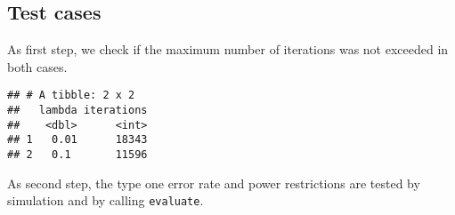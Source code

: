 \documentclass[
]{book}
\newenvironment{Shaded}{\begin{snugshade}}{\end{snugshade}}
\newcommand{\DataTypeTok}[1]{\textcolor[rgb]{0.13,0.29,0.53}{#1}}
\newcommand{\KeywordTok}[1]{\textcolor[rgb]{0.13,0.29,0.53}{\textbf{#1}}}
\newcommand{\NormalTok}[1]{#1}
\newcommand{\OperatorTok}[1]{\textcolor[rgb]{0.81,0.36,0.00}{\textbf{#1}}}
\newcommand{\StringTok}[1]{\textcolor[rgb]{0.31,0.60,0.02}{#1}}
\begin{document}
\hypertarget{test-cases-13}{%
\subsection{Test cases}\label{test-cases-13}}

As first step, we check if the maximum number of iterations was not exceeded
in both cases.

\begin{Shaded}
\end{Shaded}

\begin{verbatim}
## # A tibble: 2 x 2
##   lambda iterations
##    <dbl>      <int>
## 1   0.01      18343
## 2   0.1       11596
\end{verbatim}

As second step, the type one error rate and power restrictions are tested
by simulation and by calling \texttt{evaluate}.
\end{document}
